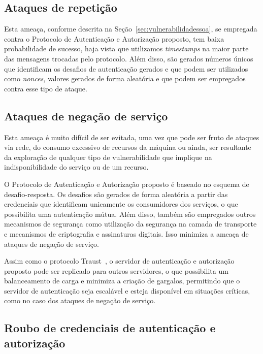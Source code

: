 \subsection{Ataques de repetição}

Esta ameaça, conforme descrita na Seção~\ref{sec:vulnerabilidadessoa}, se empregada contra o Protocolo de Autenticação e Autorização proposto, tem baixa probabilidade de sucesso, haja vista que utilizamos \emph{timestamps} na maior parte das mensagens trocadas pelo protocolo. Além disso, são gerados números únicos que identificam os desafios de autenticação gerados e que podem ser utilizados como \emph{nonces}, valores gerados de forma aleat\'{o}ria e que podem ser empregados contra esse tipo de ataque.

\subsection{Ataques de negação de serviço}

Esta ameaça é muito difícil de ser evitada, uma vez que pode ser fruto de ataques via rede, do consumo excessivo de recursos da máquina  ou ainda, ser resultante da exploração de qualquer tipo de vulnerabilidade que implique na indisponibilidade do serviço ou de um recurso.
 
O Protocolo de Autenticação e Autorização proposto é baseado no esquema de desafio-resposta. Os desafios são gerados de forma aleatória a partir das credenciais que identificam unicamente os consumidores dos serviços, o que possibilita uma autenticação mútua. Além disso, também são empregados outros mecanismos de segurança como utilização da segurança na camada de transporte e mecanismos de criptografia e assinaturas digitais. Isso minimiza a ameaça de ataques de negação de serviço.
 
Assim como o protocolo Traust~\cite{traust08}, o servidor de autenticação e autorização proposto pode ser replicado para outros servidores, o que possibilita um balanceamento de carga e minimiza a criação de gargalos, permitindo que o servidor de autenticação seja escalável e esteja disponível em situações críticas, como no caso dos ataques de negação de serviço.


\subsection{Roubo de credenciais de autenticação e autorização}\label{subsec:RouboCred}


